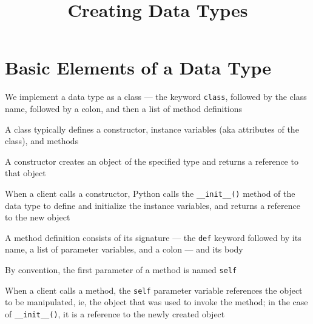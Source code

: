 \documentclass[8pt,a4paper,compress]{beamer}
\title{Creating Data Types}
\date{}
\begin{document}
\begin{frame}
\vfill
\titlepage
\end{frame}

\section{Basic Elements of a Data Type}
\begin{frame}[fragile]
\pause

We implement a data type as a class --- the keyword \lstinline{class}, followed by the class name, followed by a colon, and then a list of method definitions

\pause
\bigskip

A class typically defines a constructor, instance variables (aka attributes of the class), and methods

\pause
\bigskip

A constructor creates an object of the specified type and returns a reference to that object

\pause
\bigskip

When a client calls a constructor, Python calls the \lstinline{__init__()} method of the data type to define and initialize the instance variables, and returns a reference to the new object

\pause
\bigskip

A method definition consists of its signature --- the \lstinline{def} keyword followed by its name, a list of parameter variables, and a colon --- and its body

\pause
\bigskip

By convention, the first parameter of a method is named \lstinline{self}

\pause
\bigskip

When a client calls a method, the \lstinline{self} parameter variable references the object to be manipulated, ie, the object that was used to invoke the method; in the case of \lstinline{__init__()}, it is a reference to the newly created object
\end{frame}
\end{document}
